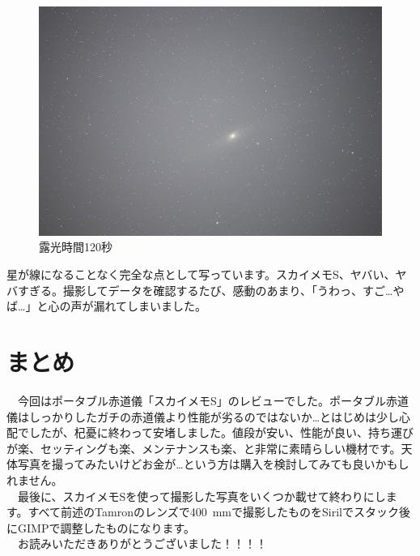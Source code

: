 \begin{figure}[H]
  \centering
  \includegraphics[width=0.7\linewidth]{sections/Kokubun/pictures/ss120.JPG}
  \caption{露光時間120秒}
  \label{ss120}
\end{figure}

\noindent
星が線になることなく完全な点として写っています。スカイメモS、ヤバい、ヤバすぎる。撮影してデータを確認するたび、感動のあまり、「うわっ、すご\dots やば\dots 」と心の声が漏れてしまいました。


\clearpage

\section{まとめ}
　今回はポータブル赤道儀「スカイメモS」のレビューでした。ポータブル赤道儀はしっかりしたガチの赤道儀より性能が劣るのではないか\dots とはじめは少し心配でしたが、杞憂に終わって安堵しました。値段が安い、性能が良い、持ち運びが楽、セッティングも楽、メンテナンスも楽、と非常に素晴らしい機材です。天体写真を撮ってみたいけどお金が\dots という方は購入を検討してみても良いかもしれません。\\
　最後に、スカイメモSを使って撮影した写真をいくつか載せて終わりにします。すべて前述のTamronのレンズで\SI{400}{mm}で撮影したものをSirilでスタック後にGIMPで調整したものになります。\\
　お読みいただきありがとうございました！！！！\\


